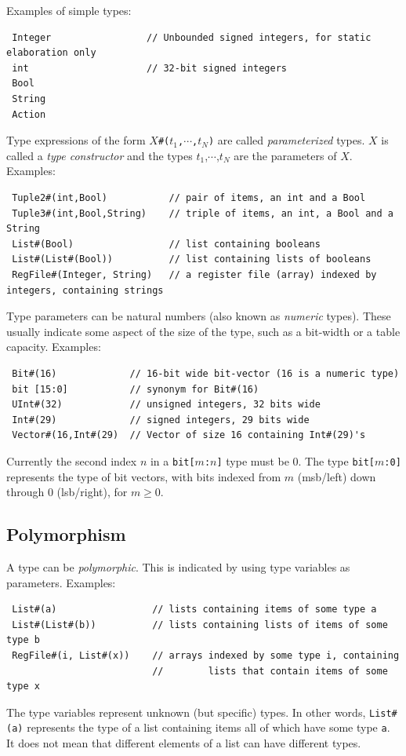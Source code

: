 \documentclass[twoside,letterpaper]{article}
\begin{document}
Examples of simple types:
\begin{verbatim}
 Integer                 // Unbounded signed integers, for static elaboration only
 int                     // 32-bit signed integers
 Bool
 String
 Action
\end{verbatim}

Type expressions of the form \texttt{$X$\#($t_1$,$\cdots$,$t_N$)} are called
\emph{parameterized}
types.  $X$ is called a \emph{type constructor} and the types
$t_1$,$\cdots$,$t_N$ are the parameters of $X$.
Examples:
\begin{verbatim}
 Tuple2#(int,Bool)           // pair of items, an int and a Bool
 Tuple3#(int,Bool,String)    // triple of items, an int, a Bool and a String
 List#(Bool)                 // list containing booleans
 List#(List#(Bool))          // list containing lists of booleans
 RegFile#(Integer, String)   // a register file (array) indexed by integers, containing strings
\end{verbatim}

Type parameters can be natural numbers (also known as \emph{numeric} types).  These
usually indicate some aspect of the size of the type, such as a
bit-width or a table capacity.
Examples:
\begin{verbatim}
 Bit#(16)             // 16-bit wide bit-vector (16 is a numeric type)
 bit [15:0]           // synonym for Bit#(16)
 UInt#(32)            // unsigned integers, 32 bits wide
 Int#(29)             // signed integers, 29 bits wide
 Vector#(16,Int#(29)  // Vector of size 16 containing Int#(29)'s
\end{verbatim}
Currently the second index $n$ in a \texttt{bit[$m$:$n$]} type must be 0.
The type \texttt{bit[$m$:0]} represents the type of bit vectors, with
bits indexed from $m$ (msb/left) down through 0 (lsb/right), for $m
\ge 0$.


\subsection{Polymorphism}

\label{sec-polymorphism-brief}

A type can be {\emph{polymorphic}}.
This is indicated by using type variables as parameters.
Examples:
\begin{verbatim}
 List#(a)                 // lists containing items of some type a
 List#(List#(b))          // lists containing lists of items of some type b
 RegFile#(i, List#(x))    // arrays indexed by some type i, containing
                          //        lists that contain items of some type x
\end{verbatim}
The type variables represent unknown (but specific) types.  In other
words, \texttt{List\#(a)} represents the type of a list containing items
all of which have some type \texttt{a}.  It does not mean that different
elements of a list can have different types.
\end{document}
